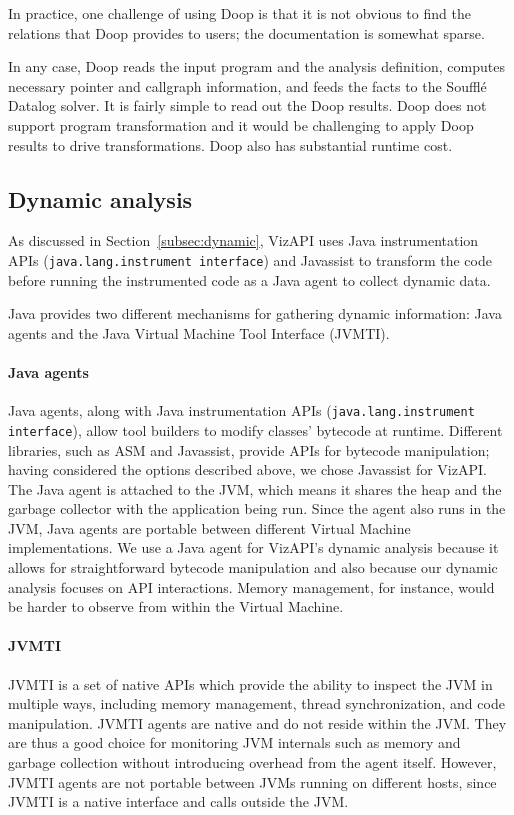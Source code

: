 In practice, one challenge of using Doop is that it is not obvious to find
the relations that Doop provides to users; the documentation is
somewhat sparse.

In any case, Doop reads the input program and the analysis definition,
computes necessary pointer and callgraph information, and feeds the
facts to the Soufflé Datalog solver. It is fairly simple to read out the
Doop results. Doop does not support program transformation and it would
be challenging to apply Doop results to drive transformations. Doop also
has substantial runtime cost.

\subsection{Dynamic analysis}
As discussed in Section~\ref{subsec:dynamic}, VizAPI uses Java instrumentation APIs (\texttt{java.lang.instrument interface}) and Javassist
to transform the code before running the instrumented code as a Java agent to collect
dynamic data.

Java provides two different mechanisms for gathering dynamic information: Java agents and the Java Virtual Machine Tool Interface (JVMTI).

\paragraph{Java agents}
Java agents, along with Java instrumentation APIs (\texttt{java.lang.instrument interface}), allow tool builders to modify classes' bytecode at runtime.
Different libraries, such as ASM and Javassist, provide APIs for bytecode manipulation; having considered the options described above, we chose Javassist for VizAPI.  
The Java agent is attached to the JVM, which means it shares the heap and the garbage collector with the application being run.
Since the agent also runs in the JVM, Java agents are portable between different Virtual Machine implementations.
We use a Java agent for VizAPI's dynamic analysis because it allows for straightforward bytecode manipulation 
and also because our dynamic analysis focuses on API interactions. Memory management, for instance, would be harder to observe from within the Virtual Machine.

\paragraph{JVMTI}
JVMTI is a set of native APIs which provide the ability to inspect the JVM in multiple ways, including memory management, 
thread synchronization, and code manipulation.
JVMTI agents are native and do not reside within the JVM. 
They are thus a good choice for monitoring JVM internals such as memory and garbage collection without introducing overhead from the agent itself.
However, JVMTI agents are not portable between JVMs running on different hosts, since JVMTI is a native interface and calls outside the JVM.

